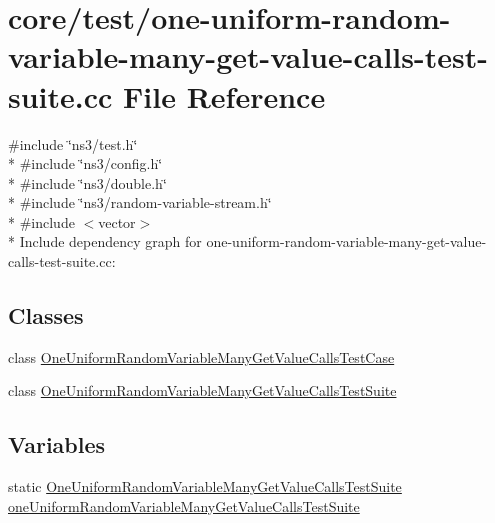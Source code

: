 \hypertarget{one-uniform-random-variable-many-get-value-calls-test-suite_8cc}{}\section{core/test/one-\/uniform-\/random-\/variable-\/many-\/get-\/value-\/calls-\/test-\/suite.cc File Reference}
\label{one-uniform-random-variable-many-get-value-calls-test-suite_8cc}
{\ttfamily \#include \char`\"{}ns3/test.\+h\char`\"{}}\\*
{\ttfamily \#include \char`\"{}ns3/config.\+h\char`\"{}}\\*
{\ttfamily \#include \char`\"{}ns3/double.\+h\char`\"{}}\\*
{\ttfamily \#include \char`\"{}ns3/random-\/variable-\/stream.\+h\char`\"{}}\\*
{\ttfamily \#include $<$vector$>$}\\*
Include dependency graph for one-\/uniform-\/random-\/variable-\/many-\/get-\/value-\/calls-\/test-\/suite.cc\+:
\subsection*{Classes}
\begin{DoxyCompactItemize}
\item 
class \hyperlink{classOneUniformRandomVariableManyGetValueCallsTestCase}{One\+Uniform\+Random\+Variable\+Many\+Get\+Value\+Calls\+Test\+Case}
\item 
class \hyperlink{classOneUniformRandomVariableManyGetValueCallsTestSuite}{One\+Uniform\+Random\+Variable\+Many\+Get\+Value\+Calls\+Test\+Suite}
\end{DoxyCompactItemize}
\subsection*{Variables}
\begin{DoxyCompactItemize}
\item 
static \hyperlink{classOneUniformRandomVariableManyGetValueCallsTestSuite}{One\+Uniform\+Random\+Variable\+Many\+Get\+Value\+Calls\+Test\+Suite} \hyperlink{one-uniform-random-variable-many-get-value-calls-test-suite_8cc_a8f10cfe627e6a00e6683416896279467}{one\+Uniform\+Random\+Variable\+Many\+Get\+Value\+Calls\+Test\+Suite}
\end{DoxyCompactItemize}


